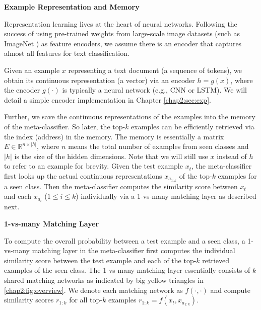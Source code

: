 \textbf{Example Representation and Memory}
\label{chap2:sec:mem}

Representation learning lives at the heart of neural networks. 
Following the success of using pre-trained weights from large-scale image datasets (such as ImageNet \cite{russakovsky2015imagenet}) as feature encoders, we assume there is an encoder that captures almost all features for text classification.

Given an example $x$ representing a text document (a sequence of tokens), we obtain its continuous representation (a vector) via an encoder $h=g(x)$, where the encoder $g(\cdot)$ is typically a neural network (e.g., CNN or LSTM).
We will detail a simple encoder implementation in Chapter \ref{chap2:sec:exp}.

Further, we save the continuous representations of the examples into the memory of the meta-classifier.
So later, the top-$k$ examples can be efficiently retrieved via the index (address) in the memory. 
The memory is essentially a matrix $E \in \mathbb{R} ^{n \times |h|}$, where $n$ means the total number of examples from seen classes and $|h|$ is the size of the hidden dimensions.
Note that we will still use $x$ instead of $h$ to refer to an example for brevity.
Given the test example $x_t$, the meta-classifier first looks up the actual continuous representations $x_{a_{1:k} }$ of the top-$k$ examples for a seen class.
Then the meta-classifier computes the similarity score between $x_t$ and each $x_{a_{i} }$ ($1\le i \le k$) individually via a 1-vs-many matching layer as described next. 

\textbf{1-vs-many Matching Layer}
\label{chap2:sec:1vsmany}

To compute the overall probability between a test example and a seen class, a 1-vs-many matching layer in the meta-classifier first computes the individual similarity score between the test example and each of the top-$k$ retrieved examples of the seen class. 
The 1-vs-many matching layer essentially consists of $k$ shared matching networks as indicated by big yellow triangles in \ref{chap2:fig:overview}.
We denote each matching network as $f(\cdot, \cdot)$ and compute similarity scores $r_{1:k}$ for all top-$k$ examples $r_{1:k}=f(x_t, x_{a_{1:k}} )$.

